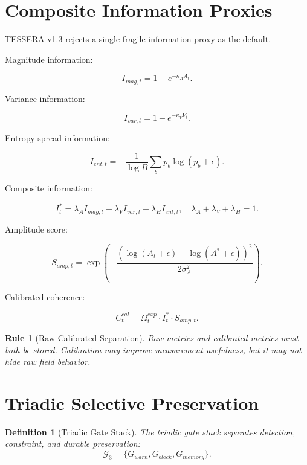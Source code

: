 \documentclass[12pt]{article}
\newtheorem{definition}{Definition}
\newtheorem{rulebox}{Rule}
\begin{document}
\section{Composite Information Proxies}

TESSERA v1.3 rejects a single fragile information proxy as the default.

Magnitude information:

\[
I_{mag,t}=1-e^{-\kappa_A A_t}.
\]

Variance information:

\[
I_{var,t}=1-e^{-\kappa_V V_t}.
\]

Entropy-spread information:

\[
I_{ent,t}= -\frac{1}{\log B}\sum_b p_b\log(p_b+\epsilon).
\]

Composite information:

\[
\boxed{
I_t^*=\lambda_A I_{mag,t}+\lambda_V I_{var,t}+\lambda_H I_{ent,t},
\quad
\lambda_A+\lambda_V+\lambda_H=1.
}
\]

Amplitude score:

\[
S_{amp,t}
=
\exp\left(
-\frac{(\log(A_t+\epsilon)-\log(A^*+\epsilon))^2}{2\sigma_A^2}
\right).
\]

Calibrated coherence:

\[
\boxed{
C^{cal}_t
=
\Omega^{exp}_t\cdot I_t^*\cdot S_{amp,t}.
}
\]

\begin{rulebox}[Raw-Calibrated Separation]
Raw metrics and calibrated metrics must both be stored. Calibration may improve
measurement usefulness, but it may not hide raw field behavior.
\end{rulebox}

\section{Triadic Selective Preservation}

\begin{definition}[Triadic Gate Stack]
The triadic gate stack separates detection, constraint, and durable
preservation:
\[
\mathcal{G}_3=\{G_{warn},G_{block},G_{memory}\}.
\]
\end{definition}
\end{document}
